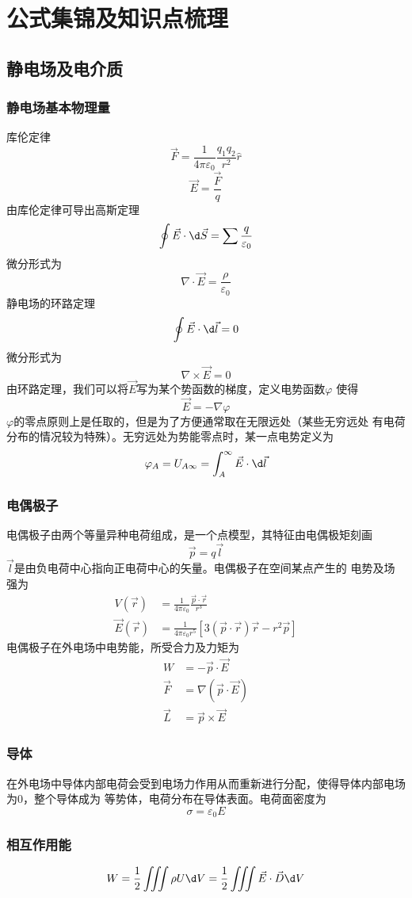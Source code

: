\documentclass[12pt, a4paper, oneside]{ctexart}
\begin{document}
\section{公式集锦及知识点梳理}
\subsection{静电场及电介质}
\subsubsection{静电场基本物理量}
库伦定律
$$\vec{F}=\frac{1}{4\pi\varepsilon_0}\frac{q_1q_2}{r^2}\hat{r}$$
$$\vec{E}=\frac{\vec{F}}{q}$$
由库伦定律可导出高斯定理
$$\oint \vec{E}\cdot \d \vec{S}=\sum\frac{q}{\varepsilon_0}$$
微分形式为
$$\nabla\cdot\vec{E}=\frac{\rho}{\varepsilon_0}$$
静电场的环路定理
$$\oint\vec{E}\cdot\d \vec{l}=0$$
微分形式为
$$\nabla\times\vec{E}=0$$
由环路定理，我们可以将$\vec{E}$写为某个势函数的梯度，定义电势函数$\varphi$
使得
$$\vec{E}=-\nabla\varphi$$
$\varphi$的零点原则上是任取的，但是为了方便通常取在无限远处（某些无穷远处
有电荷分布的情况较为特殊）。无穷远处为势能零点时，某一点电势定义为
$$\varphi_A=U_{A\infty}=\int_A^\infty \vec{E}\cdot\d \vec{l}$$
\subsubsection{电偶极子}
电偶极子由两个等量异种电荷组成，是一个点模型，其特征由电偶极矩刻画
$$\vec{p}=q\vec{l}$$
$\vec{l}$是由负电荷中心指向正电荷中心的矢量。电偶极子在空间某点产生的
电势及场强为
$$\begin{aligned}
    V(\vec{r})&=\frac{1}{4\pi\varepsilon_0}\frac{\vec{p}\cdot\vec{r}}{r^3}\\
    \vec{E}(\vec{r})&=\frac{1}{4\pi\varepsilon_0r^5}[3(\vec{p}\cdot\vec{r})\vec{r}-r^2\vec{p}]
\end{aligned}$$
电偶极子在外电场中电势能，所受合力及力矩为
$$\begin{aligned}
    W&=-\vec{p}\cdot\vec{E}\\
    \vec{F}&=\nabla(\vec{p}\cdot\vec{E})\\
    \vec{L}&=\vec{p}\times\vec{E}
\end{aligned}$$
\subsubsection{导体}
在外电场中导体内部电荷会受到电场力作用从而重新进行分配，使得导体内部电场为0，整个导体成为
等势体，电荷分布在导体表面。电荷面密度为
$$\sigma=\varepsilon_0E$$
\subsubsection{相互作用能}
$$W=\frac{1}{2}\iiint \rho U\d V=\frac{1}{2}\iiint\vec{E}\cdot\vec{D}\d V$$
\end{document}
